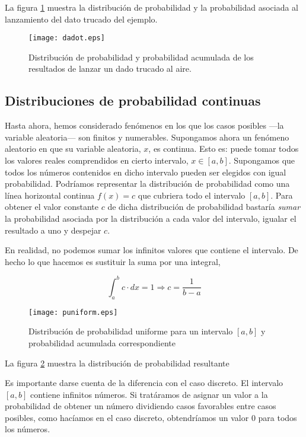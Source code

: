 La figura \ref{fig:dadot} muestra la distribución de probabilidad y la probabilidad asociada al lanzamiento del dato trucado del ejemplo.
\begin{figure}
\centering
\texttt{[image: dadot.eps]}
\caption{Distribución de probabilidad y probabilidad acumulada de los resultados de lanzar un dado trucado al aire.}
\label{fig:dadot}
\end{figure}


\subsection{Distribuciones de probabilidad continuas}\label{pdfc}
Hasta ahora, hemos considerado fenómenos en los que los casos posibles ---la variable aleatoria--- son finitos y numerables. Supongamos ahora un fenómeno aleatorio en que su variable aleatoria, $x$, es continua. Esto es: puede tomar todos los valores reales comprendidos en cierto intervalo, $x \in [a,b]$. Supongamos que todos los números contenidos en dicho intervalo pueden ser elegidos con igual probabilidad. Podríamos representar la distribución de probabilidad como una línea horizontal continua $f(x) = c$ que cubriera todo el intervalo $[a,b]$. Para obtener el valor constante $c$ de dicha distribución de probabilidad bastaría \emph{sumar} la probabilidad asociada por la distribución a cada valor del intervalo, igualar el resultado a uno y despejar $c$.

En realidad, no podemos sumar los infinitos valores que contiene el intervalo. De hecho lo que hacemos es sustituir la suma por una integral,

\begin{equation*}
\int_a^b c\cdot dx = 1 \Rightarrow c = \frac{1}{b-a}
\end{equation*}
\begin{figure}
\centering
\texttt{[image: puniform.eps]}
\caption{Distribución de probabilidad uniforme para un intervalo $[a,b]$ y probabilidad acumulada correspondiente}
\label{fig:puniform}
\end{figure}

La figura \ref{fig:puniform} muestra la distribución de probabilidad resultante

Es importante darse cuenta de la diferencia con el caso discreto. El intervalo $[a,b]$ contiene infinitos números. Si tratáramos de asignar un valor a la probabilidad de obtener un número dividiendo casos favorables entre casos posibles, como hacíamos en el caso discreto, obtendríamos un valor $0$ para todos los números. 

